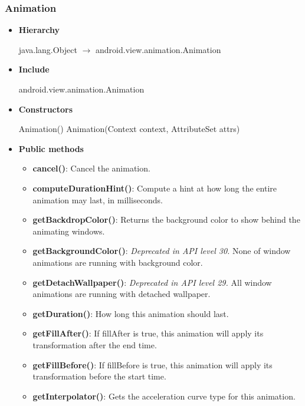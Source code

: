 \documentclass{report}
\begin{document}
    \subsubsection{Animation}
    \begin{itemize}
        \item \textbf{Hierarchy}
            \begin{center}
                java.lang.Object $\to$	android.view.animation.Animation
            \end{center}
        \item \textbf{Include}
            \bigbreak \noindent 
            \begin{javacode}
                android.view.animation.Animation
            \end{javacode}
        \item \textbf{Constructors}
            \bigbreak \noindent 
            \begin{javacode}
                Animation()
                Animation(Context context, AttributeSet attrs)
            \end{javacode}
        \item \textbf{Public methods}
            \begin{itemize}
                \item \textbf{cancel()}: Cancel the animation.
                \item \textbf{computeDurationHint()}: Compute a hint at how long the entire animation may last, in milliseconds.
                \item \textbf{getBackdropColor()}: Returns the background color to show behind the animating windows.
                \item \textbf{getBackgroundColor()}: \textit{Deprecated in API level 30.} None of window animations are running with background color.
                \item \textbf{getDetachWallpaper()}: \textit{Deprecated in API level 29.} All window animations are running with detached wallpaper.
                \item \textbf{getDuration()}: How long this animation should last.
                \item \textbf{getFillAfter()}: If fillAfter is true, this animation will apply its transformation after the end time.
                \item \textbf{getFillBefore()}: If fillBefore is true, this animation will apply its transformation before the start time.
                \item \textbf{getInterpolator()}: Gets the acceleration curve type for this animation.

\end{itemize}
\end{itemize}
\end{document}
